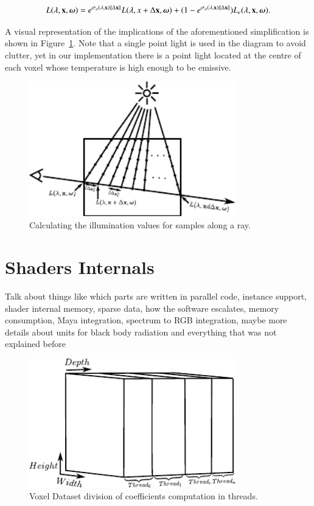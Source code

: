 \begin{equation}
L(\lambda, \mathbf{x}, \boldsymbol{\omega}) = e^{\sigma_a(\lambda, \mathbf{x}) \left \| \Delta \mathbf{x} \right \|} L(\lambda, x + \Delta\mathbf{x}, \boldsymbol{\omega}) +  (1 - e^{\sigma_a(\lambda, \mathbf{x}) \left \| \Delta \mathbf{x} \right \|}) L_e(\lambda, \mathbf{x}, \boldsymbol{\omega}).
\end{equation}

A visual representation of the implications of the aforementioned simplification is shown in Figure~\ref{fig:ray_marching}.
Note that a single point light is used in the diagram to avoid clutter, yet in our implementation there is a point light located at the centre of each voxel whose temperature is high enough to be emissive.

\begin{figure}[htbp!]
	\centering
	\includegraphics[width=0.8\textwidth]{img/ray_marching}
	\caption{Calculating the illumination values for samples along a ray.}
	\label{fig:ray_marching}
\end{figure}

\section{Shaders Internals}
\label{sec:shaders_internals}

Talk about things like which parts are written in parallel code, instance support, shader internal memory, sparse data, how the software escalates, memory consumption, Maya integration, spectrum to RGB integration, maybe more details about units for black body radiation and everything that was not explained before

\begin{figure}[htbp!]
\centering
\includegraphics[width=0.8\textwidth]{img/voxel_thread_division}
	\caption{Voxel Dataset division of coefficients computation in threads.}
	\label{fig:voxel_dataset_threaded}
\end{figure}

